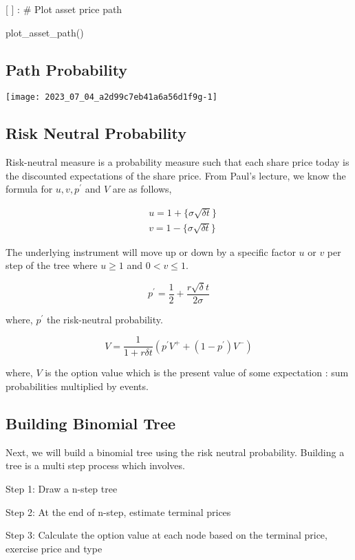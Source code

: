\documentclass[10pt]{article}
\begin{document}
[ ] : \# Plot asset price path

plot\_asset\_path()

\subsection*{Path Probability}
\begin{center}
\texttt{[image: 2023\_07\_04\_a2d99c7eb41a6a56d1f9g-1]}
\end{center}

\subsection*{Risk Neutral Probability}
Risk-neutral measure is a probability measure such that each share price today is the discounted expectations of the share price. From Paul's lecture, we know the formula for $u, v, p^{\prime}$ and $V$ are as follows,

$$
\begin{aligned}
& u=1+\{\sigma \sqrt{\delta t}\} \\
& v=1-\{\sigma \sqrt{\delta t}\}
\end{aligned}
$$

The underlying instrument will move up or down by a specific factor $u$ or $v$ per step of the tree where $u \geq 1$ and $0<v \leq 1$.

$$
p^{\prime}=\frac{1}{2}+\frac{r \sqrt{\delta} t}{2 \sigma}
$$

where, $p^{\prime}$ the risk-neutral probability.

$$
V=\frac{1}{1+r \delta t}\left(p^{\prime} V^{+}+\left(1-p^{\prime}\right) V^{-}\right)
$$

where, $V$ is the option value which is the present value of some expectation : sum probabilities multiplied by events.

\subsection*{Building Binomial Tree}
Next, we will build a binomial tree using the risk neutral probability. Building a tree is a multi step process which involves.

Step 1: Draw a n-step tree

Step 2: At the end of n-step, estimate terminal prices

Step 3: Calculate the option value at each node based on the terminal price, exercise price and type
\end{document}
